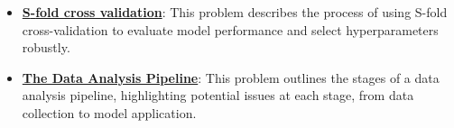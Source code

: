 \documentclass{article}%
\begin{document}
\begin{itemize}[leftmargin=*]
\item \href{https://purdue.brightspace.com/d2l/common/assets/pdfjs-d2l-dist/1.0.14-legacy/web/viewer.html?file=\%2Fcontent\%2Fenforced\%2F1095467-wl.202510.CS.24300.001\%2F10L1-CrossValidation.pdf\%3Fou\%3D1095467\&lang=en-us\&container=d2l-fileviewer-rendered-pdf\&fullscreen=d2l-fileviewer-rendered-pdf-dialog\&height=667#page=25}{\textbf{S{-}fold cross validation}}: This problem describes the process of using S-fold cross-validation to evaluate model performance and select hyperparameters robustly.%
\item \href{https://purdue.brightspace.com/d2l/common/assets/pdfjs-d2l-dist/1.0.14-legacy/web/viewer.html?file=\%2Fcontent\%2Fenforced\%2F1095467-wl.202510.CS.24300.001\%2F10L1-CrossValidation.pdf\%3Fou\%3D1095467\&lang=en-us\&container=d2l-fileviewer-rendered-pdf\&fullscreen=d2l-fileviewer-rendered-pdf-dialog\&height=667#page=26}{\textbf{The Data Analysis Pipeline}}: This problem outlines the stages of a data analysis pipeline, highlighting potential issues at each stage, from data collection to model application.%
\end{itemize}%
\end{document}
